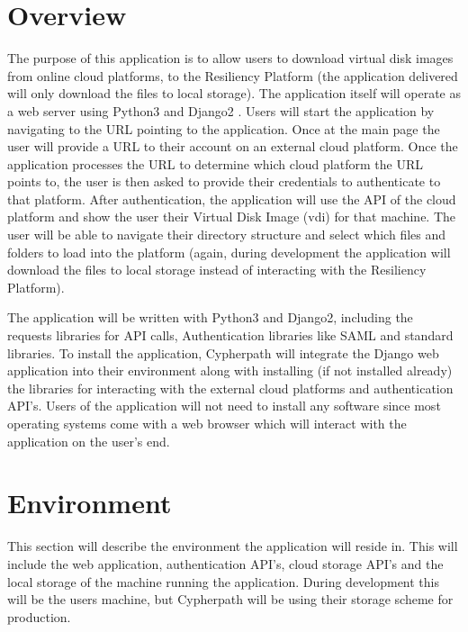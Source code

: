 \documentclass{article}
\begin{document}
	
    \section{Overview}
    The purpose of this application is to allow users to download virtual disk images from online cloud platforms, to the Resiliency Platform (the application delivered will only download the files to local storage).
    The application itself will operate as a web server using Python3 \cite{python} and Django2 \cite{django}. Users will start the application by navigating to the URL pointing to the application.
    Once at the main page the user will
    provide a URL to their account on an external cloud platform. Once the application processes the URL to determine which cloud platform the URL points to, the user is
    then asked to provide their credentials to authenticate
    to that platform. After authentication, the application will use the API of the cloud platform and show the user their Virtual Disk Image (vdi) for that machine.
    The user will be able to navigate their directory structure and select which files and folders to load into the platform (again, during development the application will download the files to local storage instead
    of interacting with the Resiliency Platform).

    The application will be written with Python3 and Django2, including the requests libraries for API calls, Authentication libraries like SAML
    and standard libraries. To install the application, Cypherpath will integrate the Django web application into their environment along with installing (if not installed already)
    the libraries for interacting with the external cloud platforms and authentication API's. Users of the application will not need to install any software since most operating systems come
    with a web browser which will interact with the application on the user's end.


    \section{Environment}
    This section will describe the environment the application will reside in. This will include the web application, authentication API's, cloud storage API's and the local storage
    of the machine running the application. During development this will be the users machine, but Cypherpath will be using their storage scheme for production.
	
\end{document}
